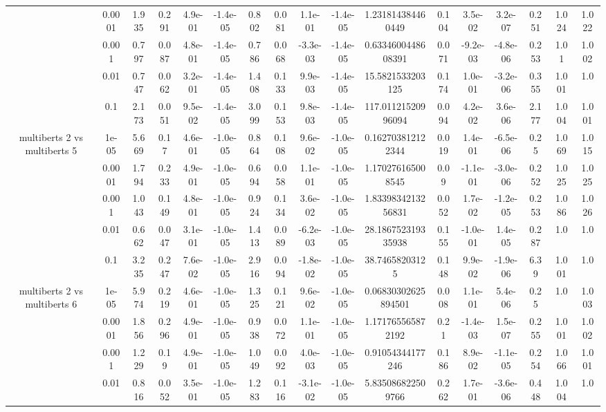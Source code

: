 \begin{tabular}{|c|c|c|c|c|c|c|c|c|c|c|c|c|c|c|c|c|}
 & 0.0001 & 1.935 & 0.291 & 4.9e-01 & -1.4e-05 & 0.802 & 0.081 & 1.1e-01 & -1.4e-05 & 1.231814384460449 & 0.104 & 3.5e-02 & 3.2e-07 & 0.251 & 1.024 & 1.022 \\
 & 0.001 & 0.797 & 0.087 & 4.8e-01 & -1.4e-05 & 0.786 & 0.068 & -3.3e-03 & -1.4e-05 & 0.6334600448608391 & 0.071 & -9.2e-03 & -4.8e-06 & 0.253 & 1.01 & 1.002 \\
 & 0.01 & 0.747 & 0.062 & 3.2e-01 & -1.4e-05 & 1.408 & 0.133 & 9.9e-03 & -1.4e-05 & 15.5821533203125 & 0.174 & 1.0e-01 & -3.2e-06 & 0.355 & 1.001 & 1.0 \\
 & 0.1 & 2.173 & 0.051 & 9.5e-02 & -1.4e-05 & 3.099 & 0.153 & 9.8e-03 & -1.4e-05 & 117.01121520996094 & 0.094 & 4.2e-02 & 3.6e-06 & 2.177 & 1.004 & 1.001 \\
\hline
\multirow{5}{*}{multiberts 2 vs multiberts 5} & 1e-05 & 5.669 & 0.17 & 4.6e-01 & -1.0e-05 & 0.864 & 0.108 & 9.6e-02 & -1.0e-05 & 0.162703812122344 & 0.019 & 1.4e-01 & -6.5e-06 & 0.25 & 1.069 & 1.015 \\
 & 0.0001 & 1.794 & 0.233 & 4.9e-01 & -1.0e-05 & 0.694 & 0.058 & 1.1e-01 & -1.0e-05 & 1.170276165008545 & 0.09 & -1.1e-01 & -3.0e-06 & 0.252 & 1.025 & 1.025 \\
 & 0.001 & 1.043 & 0.149 & 4.8e-01 & -1.0e-05 & 0.924 & 0.134 & 3.6e-02 & -1.0e-05 & 1.8339834213256831 & 0.052 & 1.7e-02 & -1.2e-05 & 0.253 & 1.086 & 1.026 \\
 & 0.01 & 0.662 & 0.047 & 3.1e-01 & -1.0e-05 & 1.413 & 0.089 & -6.2e-03 & -1.0e-05 & 28.186752319335938 & 0.155 & -1.0e-01 & 1.4e-05 & 0.287 & 1.0 & 1.0 \\
 & 0.1 & 3.235 & 0.247 & 7.6e-02 & -1.0e-05 & 2.916 & 0.094 & -1.8e-02 & -1.0e-05 & 38.74658203125 & 0.148 & 9.9e-02 & -1.9e-06 & 6.39 & 1.001 & 1.0 \\
\hline
\multirow{5}{*}{multiberts 2 vs multiberts 6} & 1e-05 & 5.974 & 0.219 & 4.6e-01 & -1.0e-05 & 1.325 & 0.121 & 9.6e-02 & -1.0e-05 & 0.06830302625894501 & 0.008 & 1.1e-01 & 5.4e-06 & 0.25 & 1.0 & 1.003 \\
 & 0.0001 & 1.856 & 0.296 & 4.9e-01 & -1.0e-05 & 0.938 & 0.072 & 1.1e-01 & -1.0e-05 & 1.171765565872192 & 0.21 & -1.4e-03 & 1.5e-07 & 0.255 & 1.001 & 1.002 \\
 & 0.001 & 1.229 & 0.19 & 4.9e-01 & -1.0e-05 & 1.049 & 0.092 & 4.0e-03 & -1.0e-05 & 0.91054344177246 & 0.186 & 8.9e-02 & -1.1e-05 & 0.254 & 1.066 & 1.001 \\
 & 0.01 & 0.816 & 0.052 & 3.5e-01 & -1.0e-05 & 1.283 & 0.116 & -3.1e-02 & -1.0e-05 & 5.835086822509766 & 0.262 & 1.7e-01 & -3.6e-06 & 0.448 & 1.004 & 1.0 \\

\end{tabular}
